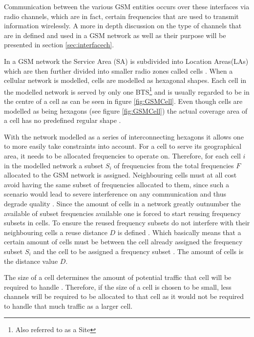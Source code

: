 Communication between the various GSM entities occurs over these interfaces via radio channels, which are in fact, certain frequencies that are used to transmit information wirelessly. A more in depth discussion on the type of channels that are in defined and used in a GSM network as well as their purpose will be presented in section \ref{sec:interfacech}.

In a GSM network the Service Area (SA) is subdivided into Location Areas(LAs) which are then further divided into smaller radio zones called cells \cite{GSMSecurInTeleNetwork}. When a cellular network is modelled, cells are modelled as hexagonal shapes. Each cell in the modelled network is served by only one BTS\footnote{Also referred to as a Site} and is usually regarded to be in the centre of a cell as can be seen in figure \ref{fig:GSMCell}\cite{GSMArchitectureProtocolsServices}. Even though cells are modelled as being hexagons (see figure \ref{fig:GSMCell}) the actual coverage area of a cell has no predefined regular shape \cite{GSMArchitectureProtocolsServices}.

With the network modelled as a series of interconnecting hexagons it allows one to more easily take constraints into account. For a cell to serve its geographical area, it needs to be allocated frequencies to operate on. Therefore, for each cell $i$ in the modelled network a subset $S_i$ of frequencies from the total frequencies $F$ allocated to the GSM network is assigned\cite{GSMArchitectureProtocolsServices}. Neighbouring cells must at all cost avoid having the same subset of frequencies allocated to them, since such a scenario would lead to severe interference on any communication and thus degrade quality \cite{GSMArchitectureProtocolsServices}.
Since the amount of cells in a network greatly outnumber the available of subset frequencies available one is forced to start reusing frequency subsets in cells. To ensure the reused frequency subsets do not interfere with their neighbouring cells a reuse distance $D$ is defined \cite{GSMArchitectureProtocolsServices}. Which basically means that a certain amount of cells must be between the cell already assigned the frequency subset $S_i$ and the cell to be assigned a frequency subset \cite{GSMArchitectureProtocolsServices}. The amount of cells is the distance value $D$.

The size of a cell determines the amount of potential traffic that cell will be required to handle \cite{GSM92,Eisenblatter,GSMArchitectureProtocolsServices}. Therefore, if the size of a cell is chosen to be small, less channels will be required to be allocated to that cell as it would not be required to handle that much traffic as a larger cell. 


